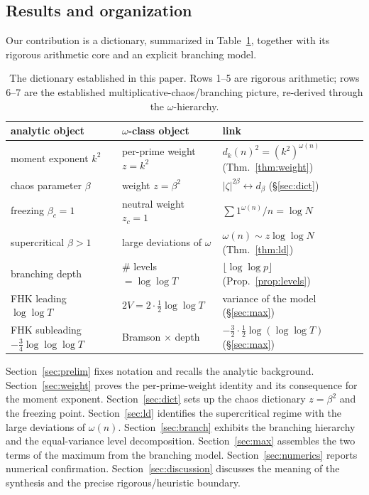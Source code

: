 \documentclass[11pt]{amsart}
\theoremstyle{definition}
\newcommand{\dk}{d_k}
\newcommand{\loglog}{\log\log}
\newcommand{\llll}{\log\log\log}
\begin{document}
\subsection{Results and organization}
Our contribution is a dictionary, summarized in Table~\ref{tab:dictionary}, together with its rigorous
arithmetic core and an explicit branching model.

\begin{table}[h]
\centering
\renewcommand{\arraystretch}{1.2}
\begin{tabular}{lll}
\toprule
analytic object & $\omega$-class object & link \\
\midrule
moment exponent $k^2$ & per-prime weight $z=k^2$ & $\dk(n)^2=(k^2)^{\omega(n)}$ (Thm.~\ref{thm:weight}) \\
chaos parameter $\beta$ & weight $z=\beta^2$ & $|\zeta|^{2\beta}\leftrightarrow d_\beta$ (\S\ref{sec:dict}) \\
freezing $\beta_c=1$ & neutral weight $z_c=1$ & $\sum 1^{\omega(n)}/n=\log N$ \\
supercritical $\beta>1$ & large deviations of $\omega$ & $\omega(n)\sim z\loglog N$ (Thm.~\ref{thm:ld}) \\
branching depth & $\#$ levels $=\loglog T$ & $\lfloor\loglog p\rfloor$ (Prop.~\ref{prop:levels}) \\
FHK leading $\loglog T$ & $2V=2\cdot\tfrac12\loglog T$ & variance of the model (\S\ref{sec:max}) \\
FHK subleading $-\tfrac34\llll T$ & Bramson $\times$ depth & $-\tfrac32\cdot\tfrac12\log(\loglog T)$ (\S\ref{sec:max}) \\
\bottomrule
\end{tabular}
\caption{The dictionary established in this paper. Rows 1--5 are rigorous arithmetic; rows 6--7 are the
established multiplicative-chaos/branching picture, re-derived through the $\omega$-hierarchy.}
\label{tab:dictionary}
\end{table}

Section~\ref{sec:prelim} fixes notation and recalls the analytic background. Section~\ref{sec:weight} proves the
per-prime-weight identity and its consequence for the moment exponent. Section~\ref{sec:dict} sets up the chaos
dictionary $z=\beta^2$ and the freezing point. Section~\ref{sec:ld} identifies the supercritical regime with the
large deviations of $\omega(n)$. Section~\ref{sec:branch} exhibits the branching hierarchy and the equal-variance
level decomposition. Section~\ref{sec:max} assembles the two terms of the maximum from the branching model.
Section~\ref{sec:numerics} reports numerical confirmation. Section~\ref{sec:discussion} discusses the meaning of
the synthesis and the precise rigorous/heuristic boundary.
\end{document}
